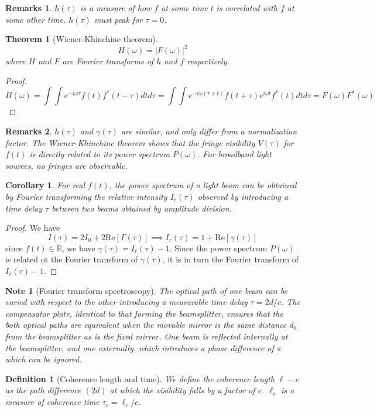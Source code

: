 \documentclass[a4paper]{article}
\newtheorem{remarks}{Remarks}[section]
\newtheorem{Note}{Note}[section]
\theoremstyle{new}
\newtheorem{defi}{Definition}[section]
\newtheorem{thm}{Theorem}[section]
\newtheorem{cor}{Corollary}[section]
\begin{document}
\begin{remarks}
$h(\tau)$ is a measure of how $f$ at some time $t$ is correlated with $f$ at some other time. $h(\tau)$ must peak for $\tau=0$.
\end{remarks}
\begin{thm}[Wiener-Khinchine theorem]
$$H(\omega)=|F(\omega)|^2$$
where $H$ and $F$ are Fourier transforms of $h$ and $f$ respectively.
\end{thm}
\begin{proof}
$$H(\omega)=\int\int e^{-i\omega\tau}f(t)f^*(t-\tau)dtd\tau=\int\int e^{-i\omega(\tau+t)}f(t+\tau)e^{i\omega t}f^*(t)dtd\tau=F(\omega)F^*(\omega)$$
\end{proof}
\begin{remarks}
$h(\tau)$ and $\gamma(\tau)$ are similar, and only differ from a normalization factor. The Wiener-Khinchine theorem shows that the fringe visibility $V(\tau)$ for $f(t)$ is directly related to its power spectrum $P(\omega)$. For broadband light sources, no fringes are observable.
\end{remarks}
\begin{cor}
For real $f(t)$, the power spectrum of a light beam can be obtained by Fourier transforming the relative intensity $I_r(\tau)$ observed by introducing a time delay $\tau$ between two beams obtained by amplitude division.
\end{cor}
\begin{proof}
We have 
$$I(\tau)=2I_0+2\text{Re}[\Gamma(\tau)]\implies I_r(\tau)=1+\text{Re}[\gamma(\tau)]$$
since $f(t)\in\mathbb{R}$, we have $\gamma(\tau)=I_r(\tau)-1$. Since the power spectrum $P(\omega)$ is related ot the Fourier transform of $\gamma(\tau)$, it is in turn the Fourier transform of $I_r(\tau)-1$.
\end{proof}
\begin{Note}[Fourier transform spectroscopy]
The optical path of one beam can be varied with respect to the other introducing a measurable time delay $\tau=2d/c$. The compensator plate, identical to that forming the beamsplitter, ensures that the both optical paths are equivalent when the movable mirror is the same distance $d_0$ from the beamsplitter as is the fixed mirror. One beam is reflected internally at the beamsplitter, and one externally, which introduces a phase difference of $\pi$ which can be ignored.
\end{Note}
\begin{defi}[Coherence length and time]
We define the coherence length $\ell-c$ as the path difference $(2d)$ at which the visibility falls by a factor of $e$. $\ell_c$ is a measure of coherence time $\tau_c=\ell_c/c$.
\end{defi}
\end{document}
